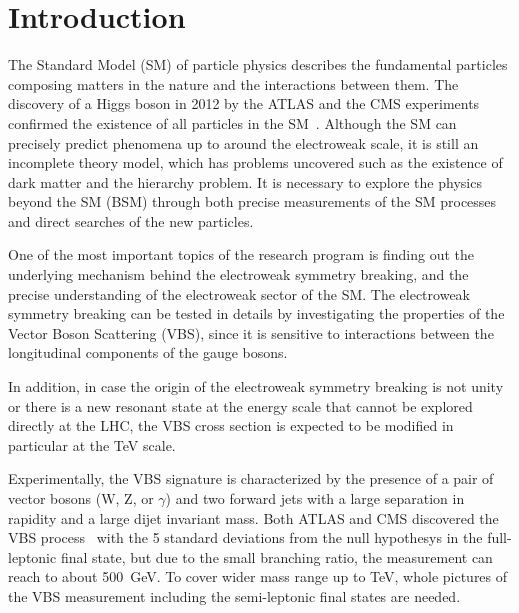\chapter{Introduction}
\label{chap:introduction}


The Standard Model (SM) of particle physics describes the fundamental particles composing matters in the nature and the interactions between them. 
The discovery of a Higgs boson in 2012 by the ATLAS and the CMS experiments confirmed the existence of all particles in the SM~\cite{HIGG-2012-27,CMS-HIG-12-028}. 
Although the SM can precisely predict phenomena up to around the electroweak scale, it is still an incomplete theory model, which has problems uncovered such as the existence of dark matter and the hierarchy problem. 
It is necessary to explore the physics beyond the SM (BSM) through both precise measurements of the SM processes and direct searches of the new particles.

One of the most important topics of the research program is finding out the underlying mechanism behind the electroweak symmetry breaking, and the precise understanding of the electroweak sector of the SM. 
The electroweak symmetry breaking can be tested in details by investigating the properties of the Vector Boson Scattering (VBS), since it is sensitive to interactions between the longitudinal components of the gauge bosons.

%
In addition, in case the origin of the electroweak symmetry breaking is not unity or there is a new resonant state at the energy scale that cannot be explored directly at the LHC, the VBS cross section is expected to be modified in particular at the TeV scale.

Experimentally, the VBS signature is characterized by the presence of a pair of vector bosons (W, Z, or $\gamma$) and two forward jets with a large separation in rapidity and a large dijet invariant mass.
Both ATLAS and CMS discovered the VBS process~\cite{STDM-2017-19,CMS-SMP-20-001}
with the 5 standard deviations from the null hypothesys in the full-leptonic final state, but due to the small branching ratio, the measurement can reach to about 500~GeV.
To cover wider mass range up to TeV, whole pictures of the VBS measurement including the semi-leptonic final states are needed.

